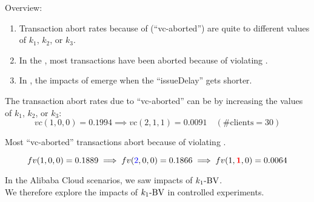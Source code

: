 \begin{frame}{}
  Overview:
  \begin{enumerate}[<+->]
    \setlength{\itemsep}{5pt}
    \item Transaction abort rates because of  (``vc-aborted'')
      are quite  to different values of $k_1$, $k_2$, or $k_3$.
    \item In the , most transactions have been aborted because of violating \red{$\ktwofv$}.
    \item In , the impacts of \red{$\konebv$} emerge when the ``issueDelay'' gets shorter.
  \end{enumerate}

  \vspace{0.50cm}
\end{frame}

\begin{frame}{}

  The transaction abort rates due to ``vc-aborted'' \pause can be 
  by  increasing the values of $k_1$, $k_2$, or $k_3$:
  \[
    vc(1,0,0) = 0.1994 \implies vc(2,1,1) = 0.0091 \quad (\text{\#clients} = 30)
  \]
\end{frame}

\begin{frame}{}

  \centerline{Most ``vc-aborted'' transactions abort because of violating \red{$\ktwofv$}.}
  \vspace{-0.50cm}
  \[
    fv(1,0,0) = 0.1889 \implies fv(\textcolor{blue}{2},0,0) = 0.1866 \implies fv(1,\textcolor{red}{\bf 1},0) = 0.0064
  \]
\end{frame}

\begin{frame}{}
  \begin{center}
    In the Alibaba Cloud scenarios, we saw  impacts of $\konebv$. \\[30pt]

    \pause
    We therefore explore the impacts of $\konebv$ in controlled experiments.
  \end{center}
\end{frame}

